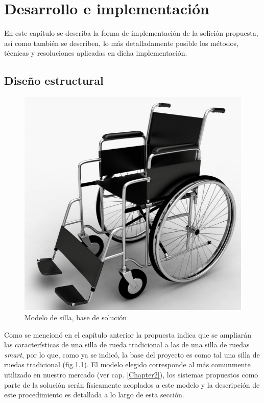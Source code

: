 
\chapter{Desarrollo e implementaci\'on} %


\label{Chapter4} %



En este cap\'itulo se describa la forma de implementaci\'on de la solici\'on
propuesta, as\'i como tambi\'en se describen, lo m\'as detalladamente posible
los m\'etodos, t\'ecnicas y resoluciones aplicadas en dicha implementaci\'on.

\section{Dise\~no estructural}

\begin{figure}[th]
    \centering
    \includegraphics[width=.5\textwidth]{Figures/wheelchair.png}
    \decoRule
    \caption{Modelo de silla, base de soluci\'on}
    \label{fig:wheelchair}
\end{figure}

Como se mencion\'o en el cap\'itulo anterior la propuesta indica que se
ampliar\'an las caracter\'isticas de una silla de rueda tradicional a las de una
silla de ruedas \emph{smart}, por lo que, como ya se indic\'o, la base del
proyecto es como tal una silla de ruedas tradicional (fig.\ref{fig:wheelchair}).
El modelo elegido corresponde al m\'as comunmente utilizado en nuestro mercado
(ver cap. \ref{Chapter2}), los sistemas propuestos como parte de la soluci\'on
ser\'an f\'isicamente acoplados a este modelo y la descripci\'on de este
procedimiento es detallada a lo largo de esta secci\'on.


